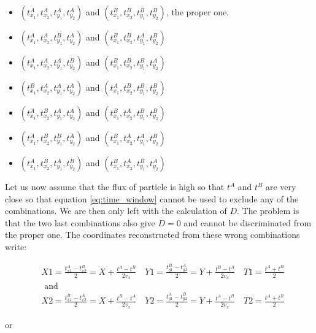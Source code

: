 \begin{itemize}
    \item $(t^A_{x_1},t^A_{x_2},t^A_{y_1},t^A_{y_2})$ and $(t^B_{x_1},t^B_{x_2},t^B_{y_1},t^B_{y_2})$, the proper one.
    
    \item $(t^A_{x_1},t^A_{x_2},t^B_{y_1},t^A_{y_2})$ and $(t^B_{x_1},t^B_{x_2},t^A_{y_1},t^B_{y_2})$
    
    \item $(t^A_{x_1},t^A_{x_2},t^A_{y_1},t^B_{y_2})$ and $(t^B_{x_1},t^B_{x_2},t^B_{y_1},t^A_{y_2})$
    
    \item $(t^B_{x_1},t^A_{x_2},t^A_{y_1},t^A_{y_2})$ and $(t^A_{x_1},t^B_{x_2},t^B_{y_1},t^B_{y_2})$
    
    \item $(t^A_{x_1},t^B_{x_2},t^A_{y_1},t^A_{y_2})$ and $(t^B_{x_1},t^A_{x_2},t^B_{y_1},t^B_{y_2})$
    
    \item $(t^A_{x_1},t^B_{x_2},t^B_{y_1},t^A_{y_2})$ and $(t^B_{x_1},t^A_{x_2},t^A_{y_1},t^B_{y_2})$
    
    \item $(t^A_{x_1},t^B_{x_2},t^A_{y_1},t^B_{y_2})$ and $(t^B_{x_1},t^A_{x_2},t^B_{y_1},t^A_{y_2})$
\end{itemize}

Let us now assume that the flux of particle is high so that $t^A$ and $t^B$ are very close so that equation \ref{eq:time_window} cannot be used to exclude any of the combinations. We are then only left with the calculation of $D$. The problem is that the two last combinations also give $D=0$ and cannot be discriminated from the proper one. The coordinates reconstructed from these wrong combinations write:

\begin{equation}
\begin{aligned}
&X 1=\frac{t_{x 1}^{A}-t_{x 2}^{B}}{2}=X+\frac{t^{A}-t^{B}}{2 v_{x}} \quad Y 1=\frac{t_{y 1}^{B}-t_{y 2}^{A}}{2}=Y+\frac{t^{B}-t^{A}}{2 v_{x}} \quad T 1=\frac{t^{A}+t^{B}}{2}\\
&\text { and }\\
&X 2=\frac{t_{x 1}^{B}-t_{x 2}^{A}}{2}=X+\frac{t^{B}-t^{A}}{2 v_{x}} \quad Y 2=\frac{t_{y 1}^{A}-t_{y 2}^{B}}{2}=Y+\frac{t^{A}-t^{B}}{2 v_{x}} \quad T 2=\frac{t^{A}+t^{B}}{2}
\end{aligned}
\end{equation}

\noindent or 

